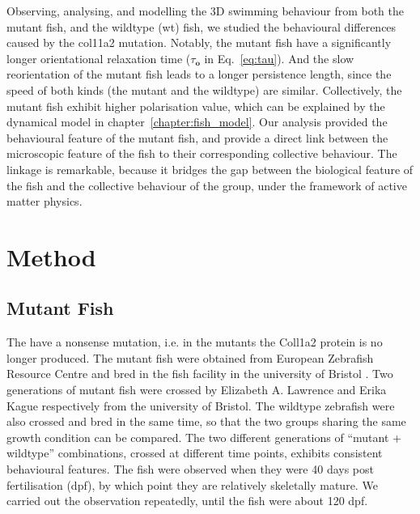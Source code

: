 \documentclass[11pt,twoside]{report}
\begin{document}
Observing, analysing, and modelling the 3D swimming behaviour from both the mutant fish, and the wildtype (\gls{wt}) fish, we studied the behavioural differences caused by the col11a2 mutation. Notably, the mutant fish have a significantly longer orientational relaxation time ($\tau_\mathbf{o}$ in Eq.~\ref{eq:tau}). And the slow reorientation of the mutant fish leads to a longer persistence length, since the speed of both kinds (the mutant and the wildtype) are similar. Collectively, the mutant fish exhibit higher polarisation value, which can be explained by the dynamical model in chapter~\ref{chapter:fish_model}. Our analysis provided the behavioural feature of the mutant fish, and provide a direct link between the microscopic feature of the fish to their corresponding collective behaviour.
The linkage is remarkable, because it bridges the gap between the biological feature of the fish and the collective behaviour of the group, under the framework of active matter physics.


\section{Method}

\subsection{Mutant Fish}

The {\mf} have a nonsense mutation, i.e. in the mutants the Coll1a2 protein is no longer produced. The mutant fish were obtained from European Zebrafish Resource Centre and bred in the fish facility in the university of Bristol \cite{lawrence2018}. Two generations of mutant fish were crossed by Elizabeth A. Lawrence and Erika Kague respectively from the university of Bristol. The wildtype zebrafish were also crossed and bred in the same time, so that the two groups sharing the same growth condition can be compared. The two different generations of ``mutant + wildtype'' combinations, crossed at different time points, exhibits consistent behavioural features. The fish were observed when they were 40 days post fertilisation (\gls{dpf}), by which point they are relatively skeletally mature. We carried out the observation repeatedly, until the fish were about 120 dpf.
\end{document}
